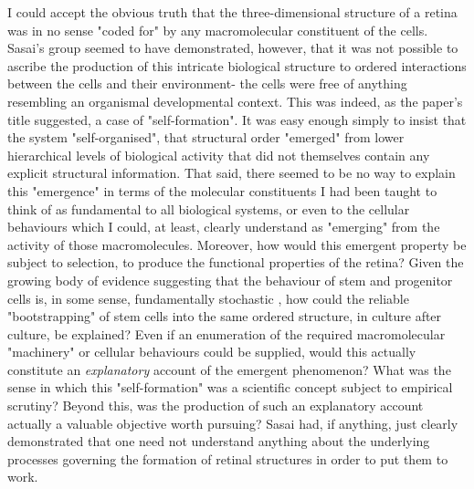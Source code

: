 I could accept the obvious truth that the three-dimensional structure of a retina was in no sense "coded for" by any macromolecular constituent of the cells. Sasai's group seemed to have demonstrated, however, that it was not possible to ascribe the production of this intricate biological structure to ordered interactions between the cells and their environment- the cells were free of anything resembling an organismal developmental context. This was indeed, as the paper's title suggested, a case of "self-formation". It was easy enough simply to insist that the system "self-organised", that structural order "emerged" from lower hierarchical levels of biological activity that did not themselves contain any explicit structural information. That said, there seemed to be no way to explain this "emergence" in terms of the molecular constituents I had been taught to think of as fundamental to all biological systems, or even to the cellular behaviours which I could, at least, clearly understand as "emerging" from the activity of those macromolecules. Moreover, how would this emergent property be subject to selection, to produce the functional properties of the retina? Given the growing body of evidence suggesting that the behaviour of stem and progenitor cells is, in some sense, fundamentally stochastic \cite{Chang2008}, how could the reliable "bootstrapping" of stem cells into the same ordered structure, in culture after culture, be explained? Even if an enumeration of the required macromolecular "machinery" or cellular behaviours could be supplied, would this actually constitute an \textit{explanatory} account of the emergent phenomenon? What was the sense in which this "self-formation" was a scientific concept subject to empirical scrutiny? Beyond this, was the production of such an explanatory account actually a valuable objective worth pursuing? Sasai had, if anything, just clearly demonstrated that one need not understand anything about the underlying processes governing the formation of retinal structures in order to put them to work.

